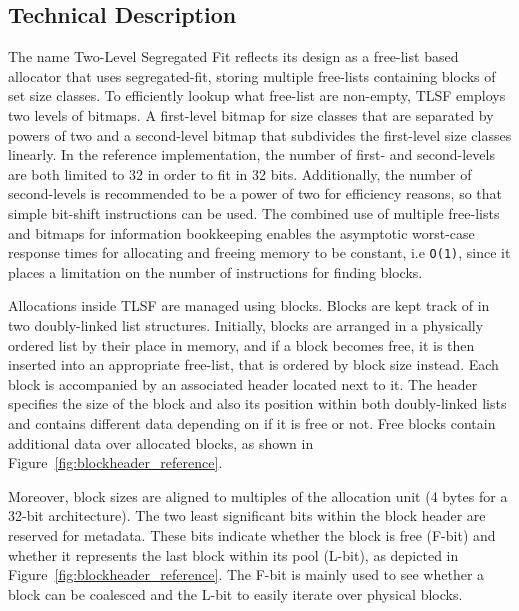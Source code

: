 \subsection{Technical Description}

The name Two-Level Segregated Fit reflects its design as a free-list based allocator that uses segregated-fit, storing multiple free-lists containing blocks of set size classes. To efficiently lookup what free-list are non-empty, TLSF employs two levels of bitmaps. A first-level bitmap for size classes that are separated by powers of two and a second-level bitmap that subdivides the first-level size classes linearly. In the reference implementation, the number of first- and second-levels are both limited to 32 in order to fit in 32 bits. Additionally, the number of second-levels is recommended to be a power of two for efficiency reasons, so that simple bit-shift instructions can be used. The combined use of multiple free-lists and bitmaps for information bookkeeping enables the asymptotic worst-case response times for allocating and freeing memory to be constant, i.e \texttt{O(1)}, since it places a limitation on the number of instructions for finding blocks.

Allocations inside TLSF are managed using blocks. Blocks are kept track of in two doubly-linked list structures. Initially, blocks are arranged in a physically ordered list by their place in memory, and if a block becomes free, it is then inserted into an appropriate free-list, that is ordered by block size instead. Each block is accompanied by an associated header located next to it. The header specifies the size of the block and also its position within both doubly-linked lists and contains different data depending on if it is free or not. Free blocks contain additional data over allocated blocks, as shown in Figure~\ref{fig:blockheader_reference}.

Moreover, block sizes are aligned to multiples of the allocation unit (4 bytes for a 32-bit architecture). The two least significant bits within the block header are reserved for metadata. These bits indicate whether the block is free (F-bit) and whether it represents the last block within its pool (L-bit), as depicted in Figure~\ref{fig:blockheader_reference}. The F-bit is mainly used to see whether a block can be coalesced and the L-bit to easily iterate over physical blocks.

